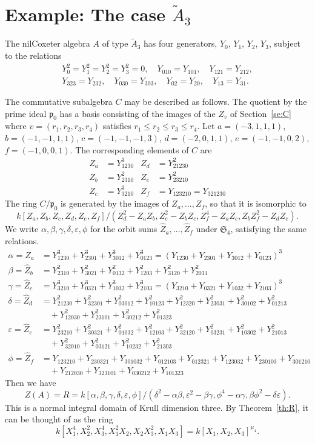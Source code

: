 \documentclass[12pt]{amsart}
\newcommand{\ep}{\varepsilon}
\renewcommand{\le}{\leqslant}
\newcommand{\sym}[1]{\mathfrak{S}_{#1}}
\newcommand{\mfp}{\mathfrak{p}}
\numberwithin{equation}{section}
\theoremstyle{definition}
\begin{document}
\section{\texorpdfstring{Example: The case $\tilde A_3$}
{Example: The case Ã₃}}

The nilCoxeter algebra $A$ of type $\tilde A_3$ has four generators,
$Y_0$, $Y_1$, $Y_2$, $Y_3$, subject to the relations
\begin{gather*} Y_0^2=Y_1^2=Y_2^2=Y_3^2=0,\quad Y_{010}=Y_{101},\quad
Y_{121}=Y_{212},\\ Y_{323}=Y_{232},\quad
Y_{030}=Y_{303},\quad Y_{02}=Y_{20},\quad Y_{13}=Y_{31}. 
\end{gather*}

The commutative subalgebra $C$ may be described as follows. The
quotient by the prime ideal $\mfp_0$ has a basis consisting of the
images of the $Z_v$ of Section~\ref{se:C} where
$v=(r_1,r_2,r_3,r_4)$ satisfies $r_1\le r_2\le r_3\le r_4$. Let 
$a=(-3,1,1,1)$, $b=(-1,-1,1,1)$, $c=(-1,-1,-1,3)$, $d=(-2,0,1,1)$,
$e=(-1,-1,0,2)$, $f=(-1,0,0,1)$. The corresponding elements of $C$ are 
\begin{align*}
Z_a&=Y_{1230}^3&Z_d&=Y_{21230}^2\\
Z_b&=Y_{2310}^2& Z_e&=Y_{23210}^2\\
Z_c&=Y_{3210}^3&Z_f&=Y_{123210}=Y_{321230} 
\end{align*}
The ring $C/\mfp_0$ is generated by the images of $Z_a,\dots,Z_f$, so
that it is isomorphic to
\[ k[Z_a,Z_b,Z_c,Z_d,Z_e,Z_f]/(Z_d^2-Z_aZ_b,
Z_e^2-Z_bZ_c,Z_f^4-Z_aZ_c,Z_bZ_f^2-Z_dZ_e). \]
We write $\alpha,\beta,\gamma,\delta,\ep,\phi$ for the
orbit sums $\hat Z_a,\dots,\hat Z_f$ under $\sym{4}$, satisfying the same
relations. 
\begin{align*} 
\alpha=\hat Z_a &=Y_{1230}^3+Y_{2301}^3+Y_{3012}^3+Y_{0123}^3
=(Y_{1230}+Y_{2301}+Y_{3012}+Y_{0123})^3\\
\beta=\hat Z_b
&=Y_{2310}^2+Y_{3021}^2+Y_{0132}^2+Y_{1203}^2+Y_{3120}^2+Y_{2031}^2\\
\gamma=\hat Z_c&=Y_{3210}^3+Y_{0321}^3+Y_{1032}^3+Y_{2103}^3
=(Y_{3210}+Y_{0321}+Y_{1032}+Y_{2103})^3\\
\delta=\hat Z_d&=Y_{21230}^2+Y_{32301}^2+Y_{03012}^2+Y_{10123}^2
+Y_{12320}^2+Y_{23031}^2+Y_{30102}^2+Y_{01213}^2\\
&\quad+Y_{12030}^2+Y_{23101}^2+Y_{30212}^2+Y_{01323}^2\\
\ep=\hat Z_e&=Y_{23210}^2+Y_{30321}^2+Y_{01032}^2+Y_{12103}^2
+Y_{32120}^2+Y_{03231}^2+Y_{10302}^2+Y_{21013}^2\\
&\quad+Y_{32010}^2+Y_{03121}^2+Y_{10232}^2+Y_{21303}^2\\
\phi=\hat  Z_f&=Y_{123210}+Y_{230321}+Y_{301032}+Y_{012103}
+Y_{012321}+Y_{123032}+Y_{230103}+Y_{301210}\\
&\quad+Y_{212030}+Y_{323101}+Y_{030212}+Y_{101323}
\end{align*}
Then we have
\[ Z(A)=R=k[\alpha,\beta,\gamma,\delta,\ep,\phi]/
(\delta^2-\alpha\beta,\ep^2-\beta\gamma,\phi^4-\alpha\gamma,
\beta\phi^2-\delta\ep). \]
This is a normal integral domain of Krull dimension three. By
Theorem~\ref{th:R}, it can be thought
of as the ring 
\[ k[X_1^4,X_2^2,X_3^4,X_1^2X_2,X_2X_3^2,X_1X_3]
=k[X_1,X_2,X_3]^{\mu_4} . \]
\end{document}
